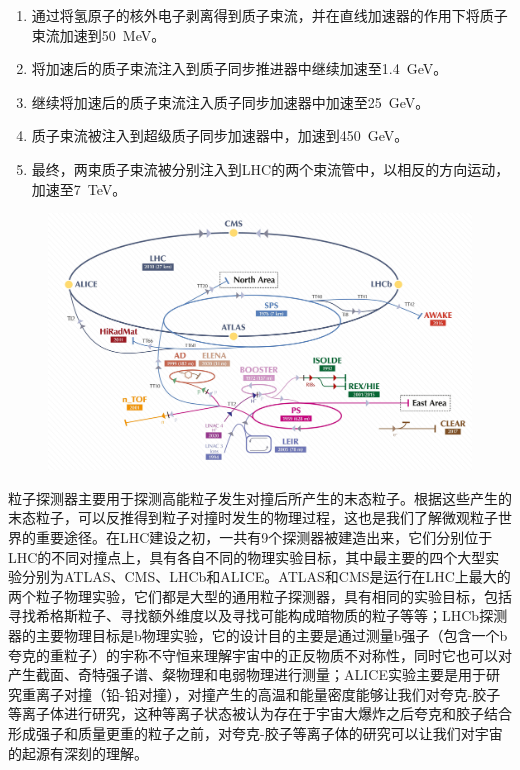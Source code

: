 \begin{enumerate}
    \item 通过将氢原子的核外电子剥离得到质子束流，并在直线加速器的作用下将质子束流加速到50~\si{\MeV}。
    \item 将加速后的质子束流注入到质子同步推进器中继续加速至1.4~\si{\GeV}。
    \item 继续将加速后的质子束流注入质子同步加速器中加速至25~\si{\GeV}。
    \item 质子束流被注入到超级质子同步加速器中，加速到450~\si{\GeV}。
    \item 最终，两束质子束流被分别注入到LHC的两个束流管中，以相反的方向运动，加速至7~\si{\TeV}。
\end{enumerate}

\begin{figure}[!htbp]
    \centering
    \includegraphics[width=1.0\textwidth]{figures/chapter02/CERN_accelerator.jpeg}
    \label{fig:c02f02}
\end{figure}

粒子探测器主要用于探测高能粒子发生对撞后所产生的末态粒子。根据这些产生的末态粒子，可以反推得到粒子对撞时发生的物理过程，这也是我们了解微观粒子世界的重要途径。在LHC建设之初，一共有9个探测器被建造出来，它们分别位于LHC的不同对撞点上，具有各自不同的物理实验目标，其中最主要的四个大型实验分别为ATLAS、CMS、LHCb和ALICE。ATLAS和CMS是运行在LHC上最大的两个粒子物理实验，它们都是大型的通用粒子探测器，具有相同的实验目标，包括寻找希格斯粒子、寻找额外维度以及寻找可能构成暗物质的粒子等等；LHCb探测器的主要物理目标是b物理实验，它的设计目的主要是通过测量b强子（包含一个b夸克的重粒子）的宇称不守恒来理解宇宙中的正反物质不对称性，同时它也可以对产生截面、奇特强子谱、粲物理和电弱物理进行测量；ALICE实验主要是用于研究重离子对撞（铅-铅对撞），对撞产生的高温和能量密度能够让我们对夸克-胶子等离子体进行研究，这种等离子状态被认为存在于宇宙大爆炸之后夸克和胶子结合形成强子和质量更重的粒子之前，对夸克-胶子等离子体的研究可以让我们对宇宙的起源有深刻的理解。

